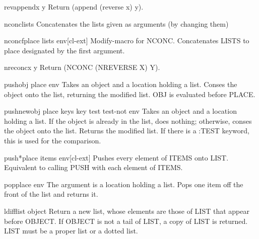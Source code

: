 \documentclass[10pt,english]{book}
\begin{document}
\begin{function}{revappend}{x y}
  Return (append (reverse x) y).
\end{function}

\begin{function}{nconc}{\rest lists}
  Concatenates the lists given as arguments (by changing them)
\end{function}

\begin{macro}{nconcf}{place \rest lists \env env}[cl-ext]
  Modify-macro for NCONC. Concatenates LISTS to place designated by the first
argument.
\end{macro}

\begin{function}{nreconc}{x y}
  Return (NCONC (NREVERSE X) Y).
\end{function}

\begin{macro}{push}{obj place \env env}
  Takes an object and a location holding a list. Conses the object onto
  the list, returning the modified list. OBJ is evaluated before PLACE.
\end{macro}

\begin{macro}{pushnew}{obj place \rest keys \key key test test-not \env env}
  Takes an object and a location holding a list. If the object is
  already in the list, does nothing; otherwise, conses the object onto
  the list. Returns the modified list. If there is a :TEST keyword, this
  is used for the comparison.
\end{macro}

\begin{macro}{push*}{place \rest items \env env}[cl-ext]
  Pushes every element of ITEMS onto LIST. Equivalent to calling PUSH
  with each element of ITEMS.
\end{macro}

\begin{macro}{pop}{place \env env}
  The argument is a location holding a list. Pops one item off the front
  of the list and returns it.
\end{macro}

\begin{function}{ldiff}{list object}
  Return a new list, whose elements are those of LIST that appear before
   OBJECT. If OBJECT is not a tail of LIST, a copy of LIST is returned.
   LIST must be a proper list or a dotted list.
\end{function}
\end{document}
